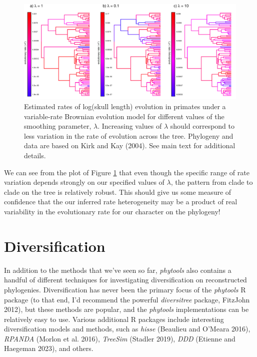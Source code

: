 \documentclass[fleqn,10pt,lineno]{wlpeerj} %
\begin{document}
\begin{figure}
\includegraphics[width=1\linewidth]{Revell.phytools-v2_peerj_files/figure-latex/fig15-multirateBM-1} \caption{Estimated rates of log(skull length) evolution in primates under a variable-rate Brownian evolution model for different values of the smoothing parameter, $\lambda$. Increasing values of $\lambda$ should correspond to less variation in the rate of evolution across the tree. Phylogeny and data are based on Kirk and Kay (2004). See main text for additional details.}\label{fig:fig15-multirateBM}
\end{figure}

We can see from the plot of Figure \ref{fig:fig15-multirateBM} that even though the specific range of rate variation depends strongly on our specified values of \(\lambda\), the pattern from clade to clade on the tree is relatively robust. This should give us some measure of confidence that the our inferred rate heterogeneity may be a product of real variability in the evolutionary rate for our character on the phylogeny!

\hypertarget{diversification}{%
\section{Diversification}\label{diversification}}

In addition to the methods that we've seen so far, \emph{phytools} also contains a handful of different techniques for investigating diversification on reconstructed phylogenies. Diversification has never been the primary focus of the \emph{phytools} R package (to that end, I'd recommend the powerful \emph{diversitree} package, FitzJohn 2012), but these methods are popular, and the \emph{phytools} implementations can be relatively easy to use. Various additional R packages include interesting diversification models and methods, such as \emph{hisse} (Beaulieu and O'Meara 2016), \emph{RPANDA} (Morlon et al. 2016), \emph{TreeSim} (Stadler 2019), \emph{DDD} (Etienne and Haegeman 2023), and others.
\end{document}
